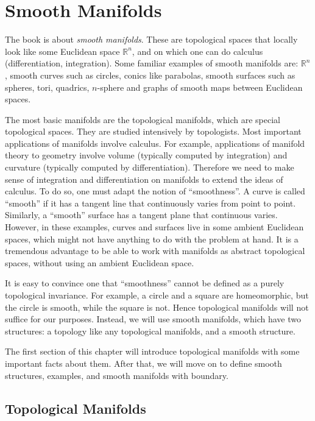 \chapter{Smooth Manifolds}

The book is about \emph{smooth manifolds}. These are topological spaces that locally look like some Euclidean space \( \mathbb{R}^{n} \), and on which one can do calculus (differentiation, integration). Some familiar examples of smooth manifolds are: \( \mathbb{R}^{n} \), smooth curves such as circles, conics like parabolas, smooth surfaces such as spheres, tori, quadrics, \( n \)-sphere and graphs of smooth maps between Euclidean spaces.

The most basic manifolds are the topological manifolds, which are special topological spaces. They are studied intensively by topologists. Most important applications of manifolds involve calculus. For example, applications of manifold theory to geometry involve volume (typically computed by integration) and curvature (typically computed by differentiation). Therefore we need to make sense of integration and differentiation on manifolds to extend the ideas of calculus. To do so, one must adapt the notion of ``smoothness''. A curve is called ``smooth'' if it has a tangent line that continuously varies from point to point. Similarly, a ``smooth'' surface has a tangent plane that continuous varies. However, in these examples, curves and surfaces live in some ambient Euclidean spaces, which might not have anything to do with the problem at hand. It is a tremendous advantage to be able to work with manifolds as abstract topological spaces, without using an ambient Euclidean space.

It is easy to convince one that ``smoothness'' cannot be defined as a purely topological invariance. For example, a circle and a square are homeomorphic, but the circle is smooth, while the square is not. Hence topological manifolds will not suffice for our purposes. Instead, we will use smooth manifolds, which have two structures: a topology like any topological manifolds, and a smooth structure.

The first section of this chapter will introduce topological manifolds with some important facts about them. After that, we will move on to define smooth structures, examples, and smooth manifolds with boundary.

\section{Topological Manifolds}

